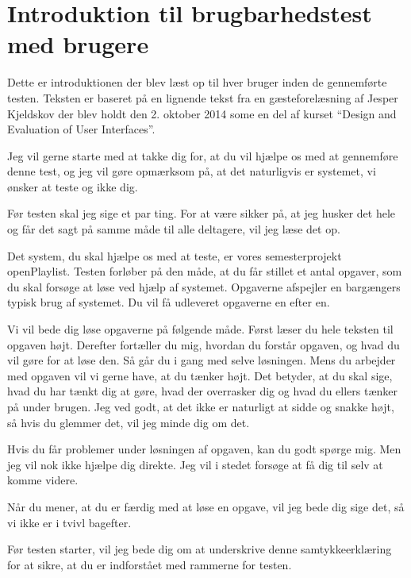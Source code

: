 \chapter{Introduktion til brugbarhedstest med brugere}
\label{usabilityTestIntro}

Dette er introduktionen der blev læst op til hver bruger inden de gennemførte testen. Teksten er baseret på en lignende tekst fra en gæsteforelæsning af Jesper Kjeldskov der blev holdt den 2. oktober 2014 some en del af kurset \enquote{Design and Evaluation of User Interfaces}.

Jeg vil gerne starte med at takke dig for, at du vil hjælpe os med at gennemføre denne test, og jeg vil gøre opmærksom på, at det naturligvis er systemet, vi ønsker at teste og ikke dig.

Før testen skal jeg sige et par ting. For at være sikker på, at jeg husker det hele og får det sagt på samme måde til alle deltagere, vil jeg læse det op.

Det system, du skal hjælpe os med at teste, er vores semesterprojekt openPlaylist. Testen forløber på den måde, at du får stillet et antal opgaver, som du skal forsøge at løse ved hjælp af systemet. Opgaverne afspejler en bargængers typisk brug af systemet. Du vil få udleveret opgaverne en efter en.

Vi vil bede dig løse opgaverne på følgende måde. Først læser du hele teksten til opgaven højt. Derefter fortæller du mig, hvordan du forstår opgaven, og hvad du vil gøre for at løse den. Så går du i gang med selve løsningen. Mens du arbejder med opgaven vil vi gerne have, at du tænker højt. Det betyder, at du skal sige, hvad du har tænkt dig at gøre, hvad der overrasker dig og hvad du ellers tænker på under brugen. Jeg ved godt, at det ikke er naturligt at sidde og snakke højt, så hvis du glemmer det, vil jeg minde dig om det.

Hvis du får problemer under løsningen af opgaven, kan du godt spørge mig. Men jeg vil nok ikke hjælpe dig direkte. Jeg vil i stedet forsøge at få dig til selv at komme videre.

Når du mener, at du er færdig med at løse en opgave, vil jeg bede dig sige det, så vi ikke er i tvivl bagefter.

Før testen starter, vil jeg bede dig om at underskrive denne samtykkeerklæring for at sikre, at du er indforstået med rammerne for testen.